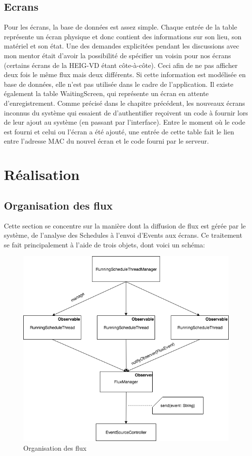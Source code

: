 \documentclass[french]{article}
\begin{document}
\subsection{Ecrans}
Pour les écrans, la base de données est assez simple. Chaque entrée de la table représente un écran physique et donc contient des informations sur son lieu, son matériel et son état.  \newline
Une des demandes explicitées pendant les discussions avec mon mentor était d'avoir la possibilité de spécifier un voisin pour nos écrans (certains écrans de la HEIG-VD étant côte-à-côte). Ceci afin de ne pas afficher deux fois le même flux mais deux différents. Si cette information est modélisée en base de données, elle n'est pas utilisée dans le cadre de l'application.\newline
Il existe également la table WaitingScreen, qui représente un écran en attente d'enregistrement. Comme précisé dans le chapitre précédent, les nouveaux écrans inconnus du système qui essaient de d'authentifier reçoivent un code à fournir lors de leur ajout au système (en passant par l'interface). Entre le moment où le code est fourni et celui ou l'écran a été ajouté, une entrée de cette table fait le lien entre l'adresse MAC du nouvel écran et le code fourni par le serveur.

\newpage	
\section{Réalisation}

\subsection{Organisation des flux}

Cette section se concentre sur la manière dont la diffusion de flux est gérée par le système, de l'analyse des Schedules à l'envoi d'Events aux écrans. Ce traitement se fait principalement à l'aide de trois objets, dont voici un schéma: 

\begin{figure}[h]
	\centering	
	\includegraphics[width=0.8\linewidth]{schemas/flux_organisation.png}%
	\caption{Organisation des flux}
\end{figure}
\end{document}
